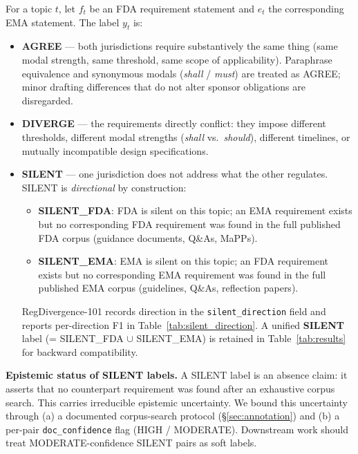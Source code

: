 \documentclass[manuscript]{acmart}
\begin{document}
\begin{revblock}
For a topic $t$, let $f_t$ be an FDA requirement statement and $e_t$ the
corresponding EMA statement. The label $y_t$ is:
\begin{itemize}
\item \textbf{AGREE} --- both jurisdictions require substantively the same
  thing (same modal strength, same threshold, same scope of applicability).
  Paraphrase equivalence and synonymous modals (\textit{shall} / \textit{must})
  are treated as AGREE; minor drafting differences that do not alter sponsor
  obligations are disregarded.
\item \textbf{DIVERGE} --- the requirements directly conflict: they impose
  different thresholds, different modal strengths (\textit{shall} vs.\
  \textit{should}), different timelines, or mutually incompatible design
  specifications.
\item \textbf{SILENT} --- one jurisdiction does not address what the other
  regulates. SILENT is \textit{directional} by construction:
  \begin{itemize}
    \item \textbf{SILENT\_FDA}: FDA is silent on this topic; an EMA requirement
      exists but no corresponding FDA requirement was found in the full published
      FDA corpus (guidance documents, Q\&As, MaPPs).
    \item \textbf{SILENT\_EMA}: EMA is silent on this topic; an FDA requirement
      exists but no corresponding EMA requirement was found in the full published
      EMA corpus (guidelines, Q\&As, reflection papers).
  \end{itemize}
  RegDivergence-101 records direction in the \texttt{silent\_direction} field
  and reports per-direction F1 in Table~\ref{tab:silent_direction}. A unified
  \textbf{SILENT} label (= SILENT\_FDA $\cup$ SILENT\_EMA) is retained in
  Table~\ref{tab:results} for backward compatibility.
\end{itemize}

\textbf{Epistemic status of SILENT labels.}
A SILENT label is an absence claim: it asserts that no counterpart requirement
was found after an exhaustive corpus search. This carries irreducible epistemic
uncertainty. We bound this uncertainty through (a) a documented corpus-search
protocol (\S\ref{sec:annotation}) and (b) a per-pair \texttt{doc\_confidence}
flag (HIGH / MODERATE). Downstream work should treat MODERATE-confidence SILENT
pairs as soft labels.


\end{revblock}
\end{document}
